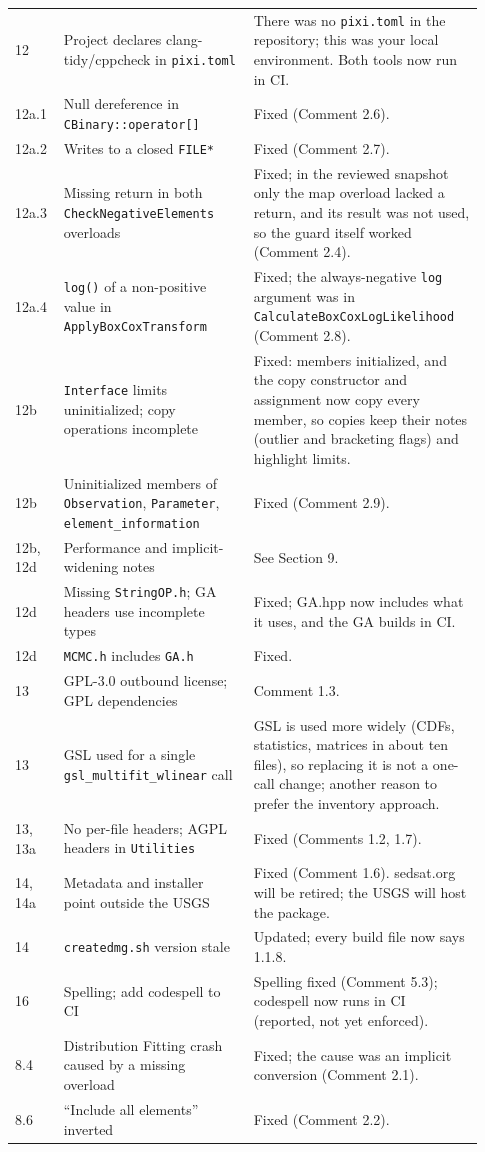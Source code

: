 \documentclass[11pt]{article}
\newcommand{\code}[1]{\texttt{#1}}
\begin{document}
{\begin{longtable}{@{}p{0.09\linewidth}p{0.38\linewidth}p{0.46\linewidth}@{}}
12 & Project declares clang-tidy/cppcheck in \code{pixi.\allowbreak{}toml} & There was no \code{pixi.\allowbreak{}toml} in the repository; this was your local environment. Both tools now run in CI.\\
12a.1 & Null dereference in \code{CBinary::\allowbreak{}operator[]} & Fixed (Comment 2.6).\\
12a.2 & Writes to a closed \code{FILE*} & Fixed (Comment 2.7).\\
12a.3 & Missing return in both \code{CheckNegativeElements} overloads & Fixed; in the reviewed snapshot only the map overload lacked a return, and its result was not used, so the guard itself worked (Comment 2.4).\\
12a.4 & \code{log()} of a non-positive value in \code{ApplyBoxCoxTransform} & Fixed; the always-negative \code{log} argument was in \code{CalculateBoxCoxLogLikelihood} (Comment 2.8).\\
12b & \code{Interface} limits uninitialized; copy operations incomplete & Fixed: members initialized, and the copy constructor and assignment now copy every member, so copies keep their notes (outlier and bracketing flags) and highlight limits.\\
12b & Uninitialized members of \code{Observation}, \code{Parameter}, \code{element\_\allowbreak{}information} & Fixed (Comment 2.9).\\
12b, 12d & Performance and implicit-widening notes & See Section 9.\\
12d & Missing \code{StringOP.\allowbreak{}h}; GA headers use incomplete types & Fixed; GA.hpp now includes what it uses, and the GA builds in CI.\\
12d & \code{MCMC.\allowbreak{}h} includes \code{GA.\allowbreak{}h} & Fixed.\\
13 & GPL-3.0 outbound license; GPL dependencies & Comment 1.3.\\
13 & GSL used for a single \code{gsl\_\allowbreak{}multifit\_\allowbreak{}wlinear} call & GSL is used more widely (CDFs, statistics, matrices in about ten files), so replacing it is not a one-call change; another reason to prefer the inventory approach.\\
13, 13a & No per-file headers; AGPL headers in \code{Utilities} & Fixed (Comments 1.2, 1.7).\\
14, 14a & Metadata and installer point outside the USGS & Fixed (Comment 1.6). sedsat.org will be retired; the USGS will host the package.\\
14 & \code{createdmg.\allowbreak{}sh} version stale & Updated; every build file now says 1.1.8.\\
16 & Spelling; add codespell to CI & Spelling fixed (Comment 5.3); codespell now runs in CI (reported, not yet enforced).\\
8.4 & Distribution Fitting crash caused by a missing overload & Fixed; the cause was an implicit conversion (Comment 2.1).\\
8.6 & ``Include all elements'' inverted & Fixed (Comment 2.2).\\
\bottomrule
\end{longtable}
}
\end{document}
